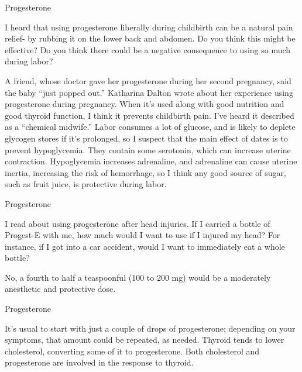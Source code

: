 \documentclass[11pt,oneside,openany,extrafontsizes]{memoir}
\begin{document}
\begin{qaexchange}{Progesterone}

    \begin{question}
        I heard that using progesterone liberally during childbirth can be a natural pain relief- by rubbing it on the lower back and abdomen. Do you think this might be effective? Do you think there could be a negative consequence to using so much during labor?
    \end{question}

    \begin{answer}
        A friend, whose doctor gave her progesterone during her second pregnancy, said the baby \enquote{just popped out.} Katharina Dalton wrote about her experience using progesterone during pregnancy. When it's used along with good nutrition and good thyroid function, I think it prevents childbirth pain. I've heard it described as a \enquote{chemical midwife.} Labor consumes a lot of glucose, and is likely to deplete glycogen stores if it's prolonged, so I suspect that the main effect of dates is to prevent hypoglycemia. They contain some serotonin, which can increase uterine contraction. Hypoglycemia increases adrenaline, and adrenaline can cause uterine inertia, increasing the risk of hemorrhage, so I think any good source of sugar, such as fruit juice, is protective during labor.
    \end{answer}
\end{qaexchange}

\begin{qaexchange}{Progesterone}

    \begin{question}
        I read about using progesterone after head injuries. If I carried a bottle of Progest-E with me, how much would I want to use if I injured my head? For instance, if I got into a car accident, would I want to immediately eat a whole bottle?
    \end{question}

    \begin{answer}
      No, a fourth to half a teaspoonful (100 to 200 mg) would be a moderately anesthetic and protective dose.
    \end{answer}
\end{qaexchange}

\begin{standalonequote}{Progesterone}

    \begin{answer}
      It's usual to start with just a couple of drops of progesterone; depending on your symptoms, that amount could be repeated, as needed. Thyroid tends to lower cholesterol, converting some of it to progesterone. Both cholesterol and progesterone are involved in the response to thyroid.
    \end{answer}
\end{standalonequote}
\end{document}
